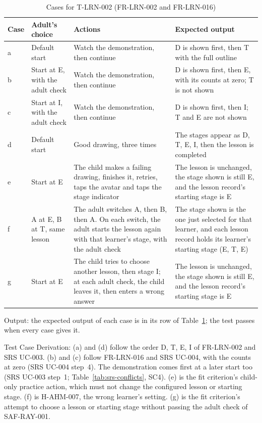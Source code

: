 \documentclass[12pt, titlepage]{article}
\begin{document}
\begin{enumerate}
\begin{table}[htbp]
\centering\small
\caption{Cases for T-LRN-002 (FR-LRN-002 and FR-LRN-016)}
\label{tab:t-lrn-002}
\begin{tabularx}{\textwidth}{@{}l >{\raggedright\arraybackslash}X
  >{\raggedright\arraybackslash}X >{\raggedright\arraybackslash}X@{}}
\toprule
\textbf{Case} & \textbf{Adult's choice} & \textbf{Actions} &
\textbf{Expected output}\\
\midrule
a & Default start & Watch the demonstration, then continue & D is shown
first, then T with the full outline\\
b & Start at E, with the adult check & Watch the demonstration, then
continue & D is shown first, then E, with its counts at zero; T is not
shown\\
c & Start at I, with the adult check & Watch the demonstration, then
continue & D is shown first, then I; T and E are not shown\\
d & Default start & Good drawing, three times & The stages appear as D, T,
E, I, then the lesson is completed\\
e & Start at E & The child makes a failing drawing, finishes it, retries,
taps the avatar and taps the stage indicator & The lesson is unchanged, the
stage shown is still E, and the lesson record's starting stage is E\\
f & A at E, B at T, same lesson & The adult switches A, then B, then A. On
each switch, the adult starts the lesson again with that learner's stage,
with the adult check & The stage shown is the one just selected for that
learner, and each lesson record holds its learner's starting stage (E, T,
E)\\
g & Start at E & The child tries to choose another lesson, then stage I; at
each adult check, the child leaves it, then enters a wrong answer & The
lesson is unchanged, the stage shown is still E, and the lesson record's
starting stage is E\\
\bottomrule
\end{tabularx}
\end{table}

Output: the expected output of each case is in its row of
Table~\ref{tab:t-lrn-002}; the test passes when every case gives it.

Test Case Derivation: (a) and (d) follow the order D, T, E, I of FR-LRN-002
and SRS UC-003. (b) and (c) follow FR-LRN-016 and SRS UC-004, with the
counts at zero (SRS UC-004 step~4). The demonstration comes first at a
later start too (SRS UC-003 step~1; Table~\ref{tab:srs-conflicts}, SC4).
(e) is the fit criterion's child-only practice action, which must not change
the configured lesson or starting stage. (f) is H-AHM-007, the
wrong learner's setting. (g) is the fit criterion's attempt to choose a
lesson or starting stage without passing the adult check of SAF-RAY-001.


\end{enumerate}
\end{document}
